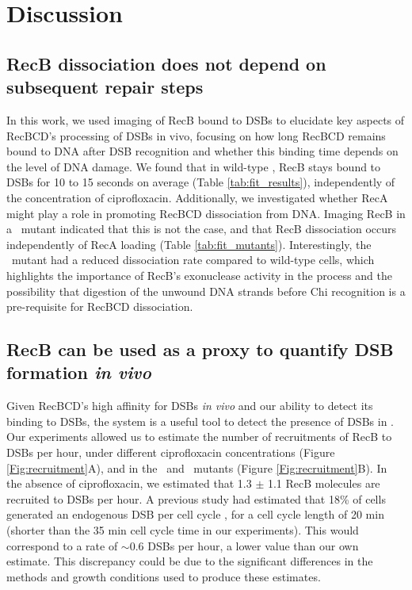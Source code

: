 \section*{Discussion}

\subsection*{RecB dissociation does not depend on subsequent repair steps}
In this work, we used imaging of RecB bound to DSBs to elucidate key aspects of RecBCD's processing of DSBs in vivo, focusing on how long RecBCD remains bound to DNA after DSB recognition and whether this binding time depends on the level of DNA damage. We found that in wild-type \ecoli, RecB stays bound to DSBs for 10 to 15 seconds on average (Table \ref{tab:fit_results}), independently of the concentration of ciprofloxacin. Additionally, we investigated whether RecA might play a role in promoting RecBCD dissociation from DNA. Imaging RecB in a \dreca\ mutant indicated that this is not the case, and that RecB dissociation occurs independently of RecA loading (Table \ref{tab:fit_mutants}). Interestingly, the \geneteneighty\ mutant had a reduced dissociation rate compared to wild-type cells, which highlights the importance of RecB's exonuclease activity in the process and the possibility that digestion of the unwound DNA strands before Chi recognition is a pre-requisite for RecBCD dissociation.

\subsection*{RecB can be used as a proxy to quantify DSB formation \emph{in vivo}}
Given RecBCD's high affinity for DSBs \emph{in vivo} and our ability to detect its binding to DSBs, the system is a useful tool to detect the presence of DSBs in \ecoli. Our experiments allowed us to estimate the number of recruitments of RecB to DSBs per hour, under different ciprofloxacin concentrations (Figure \ref{Fig:recruitment}A), and in the \dreca\ and \geneteneighty\ mutants (Figure \ref{Fig:recruitment}B). In the absence of ciprofloxacin, we estimated that 1.3 $\pm$ 1.1 RecB molecules are recruited to DSBs per hour. A previous study had estimated that 18\% of cells generated an endogenous DSB per cell cycle \cite{Sinha2018}, for a cell cycle length of 20 min (shorter than the 35 min cell cycle time in our experiments). This would correspond to a rate of $\sim$0.6 DSBs per hour, a lower value than our own estimate. This discrepancy could be due to the significant differences in the methods and growth conditions used to produce these estimates.

